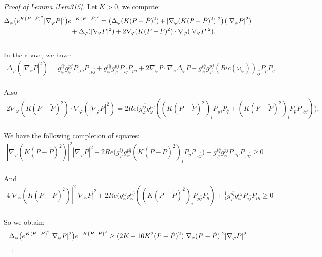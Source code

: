 \documentclass[10pt,a4paper]{amsart}
\begin{document}
\begin{proof}[Proof of Lemma \ref{Lem315}]
 Let $K>0$,  we compute:
\begin{align}
	& \Delta_{\varphi}\big(e^{K(P-\tilde P)^2}|\nabla_{\varphi}P|^2\big)e^{-K(P-\tilde P)^2} =\left( \Delta_{\varphi}(K(P-\tilde P)^2)+|\nabla_{\varphi}(K(P-\tilde P)^2)|^2 \right)(|\nabla_\varphi P|^2)  \notag \\
	&\qquad\qquad\qquad\qquad\qquad +\Delta_{\varphi}(|\nabla_{\varphi}P|^2) +2\nabla_{\varphi}(K(P-\tilde P)^2)\cdot \nabla_{\varphi}(|\nabla_{\varphi}P|^2).
\end{align}\\
In the above,  we have:
\begin{align}
\Delta_{\varphi}(|\nabla_{\varphi}P|^2)=g_{\varphi}^{i\bar{q}}g_{\varphi}^{p\bar{j}}P_{,iq}P_{,\bar{p}\bar{j}}+g_{\varphi}^{i\bar{q}}g_{\varphi}^{p\bar{j}}P_{i\bar{j}}P_{p\bar{q}}+2\nabla_{\varphi}P\cdot \nabla_{\varphi}\Delta_{\varphi}P+g_{\varphi}^{i\bar{q}}g_{\varphi}^{p\bar{j}}(Ric(\omega_{\varphi}))_{i\bar{j}}P_pP_{\bar{q}}.
\end{align}\\
Also
\begin{align}
2\nabla_{\varphi}(K(P-\tilde P)^2)\cdot \nabla_{\varphi}(|\nabla_{\varphi}P|^2)=2Re\big(g_{\varphi}^{i\bar{j}}g_{\varphi}^{p\bar{q}}((K(P-\tilde P)^2)_iP_{p\bar{j}}P_{\bar{q}}+(K(P-\tilde P)^2)_iP_pP_{,\bar{q}\bar{j}})\big).
\end{align}\\
We have the following completion of squares:
\begin{align}
|\nabla_{\varphi}(K(P-\tilde P)^2)|^2 |\nabla_\varphi P|^2 +2Re\big(g_{\varphi}^{i\bar{j}}g_{\varphi}^{p\bar{q}}(K(P-\tilde P)^2)_iP_pP_{,\bar{q}\bar{j}}\big)+g_{\varphi}^{i\bar{q}}g_{\varphi}^{p\bar{j}}P_{,ip}P_{,\bar{q}\bar{j}}\ge  0
\end{align}\\
And 
\begin{align}
	4|\nabla_{\varphi}(K(P-\tilde P)^2)|^2|\nabla_\varphi P|^2 + 2Re\big(g_{\varphi}^{i\bar{j}}g_{\varphi}^{p\bar{q}}((K(P-\tilde P)^2)_iP_{p\bar{j}}P_{\bar{q}}) +\frac{1}{4}g_{\varphi}^{i\bar{q}}g_{\varphi}^{p\bar{j}}P_{i\bar{j}}P_{p\bar{q}}\ge  0
\end{align}\\
So we obtain:
\begin{align}
	&\Delta_{\varphi}\big(e^{K(P-\tilde P)^2}|\nabla_{\varphi}P|^2\big)e^{-K(P-\tilde P)^2} \ge  (2K-16K^2(P-\tilde P)^2)|\nabla_\varphi(P-\tilde P)|^2 |\nabla_{\varphi}P|^2  \notag \\

\end{align}
\end{proof}
\end{document}
